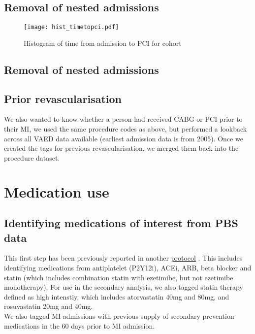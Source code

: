 \documentclass[11pt]{article}
\begin{document}
\subsection{Removal of nested admissions}
\color{violet}
\begin{stlog}\end{stlog}
\color{black}
\begin{figure} [h]
	\centering
	\texttt{[image: hist\_timetopci.pdf]}
	\caption{Histogram of time from admission to PCI for cohort}
	\label{hist_timetopci}
\end{figure}

\subsection{Removal of nested admissions}
\color{violet}
\begin{stlog}\end{stlog}
\color{black}
\subsection{Prior revascularisation}
We also wanted to know whether a person had received CABG or PCI prior to their MI, we used the same procedure codes as above, but performed a lookback across all VAED data available (earliest admission data is from 2005). Once we created the tags for previous revascularisation, we merged them back into the procedure dataset. 
\color{violet}
\begin{stlog}\end{stlog}
\color{black}
\pagebreak
\section{Medication use}
\subsection{Identifying medications of interest from PBS data}
This first step has been previously reported in another \color{blue} \href{https://github.com/cardiopharmnerd/medsremote}{protocol} \color{black}. This includes identifying medications from antiplatelet (P2Y12i), ACEi, ARB, beta blocker and statin (which includes combination statin with ezetimibe, but not ezetimibe monotherapy). For use in the secondary analysis, we also tagged statin therapy defined as high intenstiy, which includes atorvastatin 40mg and 80mg, and rosuvastatin 20mg and 40mg. \cite{collet2020}  \\
We also tagged MI admissions with previous supply of secondary prevention medications in the 60 days prior to MI admission.
\end{document}
